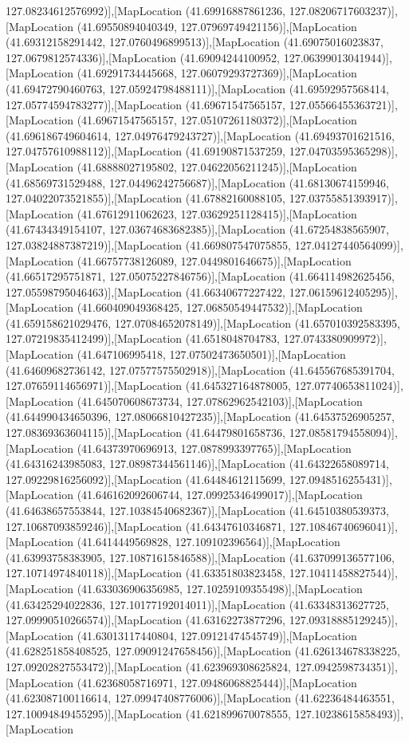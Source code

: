 127.08234612576992)],[MapLocation (41.69916887861236, 127.08206717603237)],[MapLocation (41.69550894040349, 127.07969749421156)],[MapLocation (41.69312158291442, 127.0760496899513)],[MapLocation (41.69075016023837, 127.0679812574336)],[MapLocation (41.69094244100952, 127.06399013041944)],[MapLocation (41.69291734445668, 127.06079293727369)],[MapLocation (41.69472790460763, 127.05924798488111)],[MapLocation (41.69592957568414, 127.05774594783277)],[MapLocation (41.69671547565157, 127.05566455363721)],[MapLocation (41.69671547565157, 127.05107261180372)],[MapLocation (41.696186749604614, 127.04976479243727)],[MapLocation (41.69493701621516, 127.04757610988112)],[MapLocation (41.69190871537259, 127.04703595365298)],[MapLocation (41.68888027195802, 127.04622056211245)],[MapLocation (41.68569731529488, 127.04496242756687)],[MapLocation (41.68130674159946, 127.04022073521855)],[MapLocation (41.67882160088105, 127.03755851393917)],[MapLocation (41.67612911062623, 127.03629251128415)],[MapLocation (41.67434349154107, 127.03674683682385)],[MapLocation (41.67254838565907, 127.03824887387219)],[MapLocation (41.669807547075855, 127.04127440564099)],[MapLocation (41.66757738126089, 127.0449801646675)],[MapLocation (41.66517295751871, 127.05075227846756)],[MapLocation (41.664114982625456, 127.05598795046463)],[MapLocation (41.66340677227422, 127.06159612405295)],[MapLocation (41.660409049368425, 127.06850549447532)],[MapLocation (41.659158621029476, 127.07084652078149)],[MapLocation (41.657010392583395, 127.07219835412499)],[MapLocation (41.6518048704783, 127.0743380909972)],[MapLocation (41.647106995418, 127.07502473650501)],[MapLocation (41.64609682736142, 127.07577575502918)],[MapLocation (41.645567685391704, 127.07659114656971)],[MapLocation (41.645327164878005, 127.07740653811024)],[MapLocation (41.645070608673734, 127.07862962542103)],[MapLocation (41.644990434650396, 127.08066810427235)],[MapLocation (41.64537526905257, 127.08369363604115)],[MapLocation (41.64479801658736, 127.08581794558094)],[MapLocation (41.64373970696913, 127.0878993397765)],[MapLocation (41.64316243985083, 127.08987344561146)],[MapLocation (41.64322658089714, 127.09229816256092)],[MapLocation (41.64484612115699, 127.0948516255431)],[MapLocation (41.646162092606744, 127.09925346499017)],[MapLocation (41.64638657553844, 127.10384540682367)],[MapLocation (41.64510380539373, 127.10687093859246)],[MapLocation (41.64347610346871, 127.10846740696041)],[MapLocation (41.6414449569828, 127.109102396564)],[MapLocation (41.63993758383905, 127.10871615846588)],[MapLocation (41.637099136577106, 127.10714974840118)],[MapLocation (41.63351803823458, 127.10411458827544)],[MapLocation (41.633036906356985, 127.10259109355498)],[MapLocation (41.63425294022836, 127.10177192014011)],[MapLocation (41.63348313627725, 127.09990510266574)],[MapLocation (41.63162273877296, 127.09318885129245)],[MapLocation (41.63013117440804, 127.09121474545749)],[MapLocation (41.628251858408525, 127.09091247658456)],[MapLocation (41.626134678338225, 127.09202827553472)],[MapLocation (41.623969308625824, 127.0942598734351)],[MapLocation (41.62368058716971, 127.09486068825444)],[MapLocation (41.623087100116614, 127.09947408776006)],[MapLocation (41.62236484463551, 127.10094849455295)],[MapLocation (41.621899670078555, 127.10238615858493)],[MapLocation 